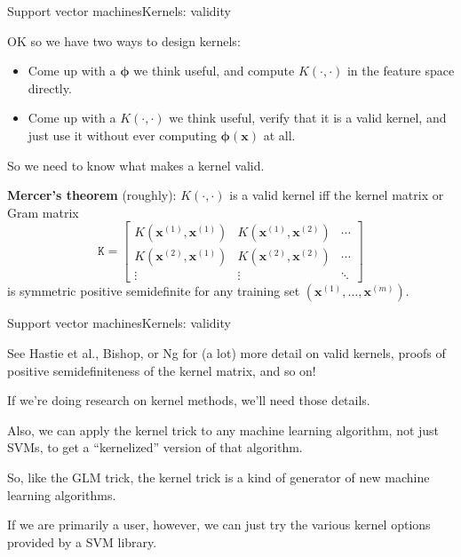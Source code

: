 \documentclass{beamer}
\renewcommand{\vec}[1]{\boldsymbol{#1}}
\newcommand{\mat}[1]{\mathtt{#1}}
\begin{document}
\begin{frame}{Support vector machines}{Kernels: validity}

  OK so we have two ways to design kernels:
  \begin{itemize}
  \item Come up with a $\vec{\phi}$ we think useful, and compute $K(\cdot,\cdot)$ in the feature space directly.
    \item Come up with a $K(\cdot,\cdot)$ we think useful, verify that
      it is a valid kernel, and just use it without ever computing
      $\vec{\phi}(\vec{x})$ at all.
  \end{itemize}

  \medskip

  So we need to know what makes a kernel valid.

  \medskip

  \textbf{Mercer's theorem} (roughly): $K(\cdot,\cdot)$ is a valid
  kernel iff the \alert{kernel matrix} or \alert{Gram matrix}
  \[ \mat{K} = \begin{bmatrix} K(\vec{x}^{(1)},\vec{x}^{(1)}) &
    K(\vec{x}^{(1)},\vec{x}^{(2)}) & \cdots \\
    K(\vec{x}^{(2)},\vec{x}^{(1)}) & K(\vec{x}^{(2)},\vec{x}^{(2)}) & \cdots \\
    \vdots & \vdots & \ddots \end{bmatrix} \]
  is symmetric positive semidefinite for any training set $(\vec{x}^{(1)},
  \ldots,\vec{x}^{(m)})$.

\end{frame}


\begin{frame}{Support vector machines}{Kernels: validity}

  See Hastie et al., Bishop, or Ng for (a lot) more detail on valid
  kernels, proofs of positive semidefiniteness of the kernel matrix, and
  so on!

  \medskip

  If we're doing research on kernel methods, we'll need those details.

  \medskip

  Also, we can apply the \alert{kernel trick} to any machine learning algorithm, not just SVMs, to get a ``kernelized'' version of that algorithm.

  \medskip

  So, like the GLM trick, the kernel trick is a kind of generator of
  new machine learning algorithms.
  
  \medskip

  If we are primarily a user, however, we can just try the various kernel
  options provided by a SVM library.
  
\end{frame}
\end{document}
